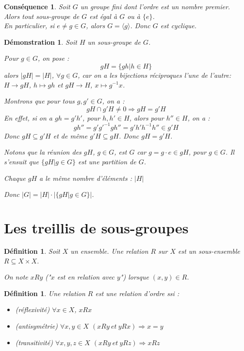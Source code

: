 \documentclass[a4paper, oneside]{report}
\theoremstyle{break}
\newtheorem{defi}[thm]{Définition}
\newtheorem{cons}[thm]{Conséquence}
\newtheorem*{demo}{Démonstration}
\newcommand{\x}{\times}
\begin{document}
\begin{cons}
	Soit $G$ un groupe fini dont l'ordre est un nombre premier.\\
	Alors tout sous-groupe de $G$ est égal à $G$ ou à $\{e\}$.\\
	En particulier, si $e\neq g\in G$, alors $G=\langle g\rangle$. Donc $G$ est cyclique.
\end{cons}

\begin{demo}
	Soit $H$ un sous-groupe de $G$.
	
	Pour $g\in G$, on pose :
	$$gH=\{gh | h\in H \}$$
	alors $|gH|=|H|$, $\forall g\in G$, car on a les bijections réciproques l'une de l'autre:
	$H \to gH$, $h \mapsto gh$ et $gH \to H$, $x \mapsto g^{-1}x$.
	
	Montrons que pour tous $g,g'\in G$, on a :
	$$gH\cap g'H \neq 0 \Rightarrow gH=g'H$$
	En effet, si on a $gh=g'h'$, pour $h,h'\in H$, alors pour $h''\in H$, on a :
	$$gh''=g'g'^{-1}gh''=g'h'h^{-1}h'' \in g'H$$
	Donc $gH\subseteq g'H$ et de même $g'H \subseteq gH$. Donc $gH=g'H$.
	
	Notons que la réunion des $gH$, $g\in G$, est $G$ car $g=g \cdot e \in gH$, pour $g\in G$. Il s'ensuit que $\{gH| g\in G \}$ est une partition de $G$.
	
	Chaque $gH$ a le même nombre d'éléments : $|H|$
	
	Donc $|G| = |H| \cdot |\{gH | g\in G \}|$.
\end{demo}

\section{Les treillis de sous-groupes}

\begin{defi}
	Soit $X$ un ensemble. Une relation $R$ sur $X$ est un sous-ensemble $R\subseteq X\x X$.
	
	On note $xRy$ ("$x$ est en relation avec $y$") lorsque $(x,y)\in R$.	
\end{defi}

\begin{defi} 
	Une relation $R$ est une relation d'ordre ssi :
	\begin{itemize}
	\item (réflexivité) $\forall x \in X$, $xRx$
	\item (antisymétrie) $\forall x,y\in X$ $(xRy~et~yRx)\Rightarrow x=y$
	\item (transitivité) $\forall x,y,z\in X$ $(xRy~et~yRz) \Rightarrow xRz$
	\end{itemize}
\end{defi}
\end{document}
